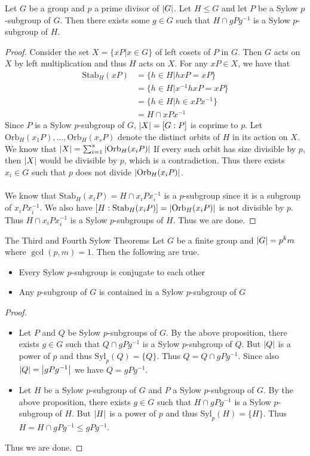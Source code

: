 \documentclass[a4paper]{article}
\begin{document}
\begin{prp}{}{} Let $G$ be a group and $p$ a prime divisor of $\abs{G}$. Let $H\leq G$ and let $P$ be a Sylow $p$-subgroup of $G$. Then there exists some $g\in G$ such that $H\cap gPg^{-1}$ is a Sylow $p$-subgroup of $H$. \tcbline
\begin{proof}
Consider the set $X=\{xP|x\in G\}$ of left cosets of $P$ in $G$. Then $G$ acts on $X$ by left multiplication and thus $H$ acts on $X$. For any $xP\in X$, we have that 
\begin{align*}
\text{Stab}_H(xP)&=\{h\in H|hxP=xP\}\\
&=\{h\in H|x^{-1}hxP=xP\}\\
&=\{h\in H|h\in xPx^{-1}\}\\
&=H\cap xPx^{-1}
\end{align*}
Since $P$ is a Sylow $p$-subgroup of $G$, $\abs{X}=[G:P]$ is coprime to $p$. Let $\text{Orb}_H(x_1P),\dots,\text{Orb}_H(x_sP)$ denote the distinct orbits of $H$ in its action on $X$. We know that $\abs{X}=\sum_{i=1}^s\abs{\text{Orb}_H(x_iP)}$ If every such orbit has size divisible by $p$, then $\abs{X}$ would be divisible by $p$, which is a contradiction. Thus there exists $x_i\in G$ such that $p$ does not divide $\abs{\text{Orb}_H(x_iP)}$. \\~\\
We know that $\text{Stab}_H(x_iP)=H\cap x_iPx_i^{-1}$ is a $p$-subgroup since it is a subgroup of $x_iPx_i^{-1}$. We also have $[H:\text{Stab}_H(x_iP)]=\abs{\text{Orb}_H(x_iP)}$ is not divisible by $p$. Thus $H\cap x_iPx_i^{-1}$ is a Sylow $p$-subgroups of $H$. Thus we are done. 
\end{proof}
\end{prp}

\begin{thm}{The Third and Fourth Sylow Theorems}{} Let $G$ be a finite group and $\abs{G}=p^km$ where $\gcd(p,m)=1$. Then the following are true. 
\begin{itemize}
\item Every Sylow $p$-subgroup is conjugate to each other
\item Any $p$-subgroup of $G$ is contained in a Sylow $p$-subgroup of $G$
\end{itemize} \tcbline
\begin{proof}~\\
\begin{itemize}
\item Let $P$ and $Q$ be Sylow $p$-subgroups of $G$. By the above proposition, there exists $g\in G$ such that $Q\cap gPg^{-1}$ is a Sylow $p$-subgroup of $Q$. But $\abs{Q}$ is a power of $p$ and thus $\text{Syl}_p(Q)=\{Q\}$. Thus $Q=Q\cap gPg^{-1}$. Since also $\abs{Q}=\abs{gPg^{-1}}$ we have $Q=gPg^{-1}$. 
\item Let $H$ be a Sylow $p$-subgroup of $G$ and $P$ a Sylow $p$-subgroup of $G$. By the above proposition, there exists $g\in G$ such that $H\cap gPg^{-1}$ is a Sylow $p$-subgroup of $H$. But $\abs{H}$ is a power of $p$ and thus $\text{Syl}_p(H)=\{H\}$. Thus $H=H\cap gPg^{-1}\leq gPg^{-1}$. 
\end{itemize}
Thus we are done. 
\end{proof}
\end{thm}
\end{document}
